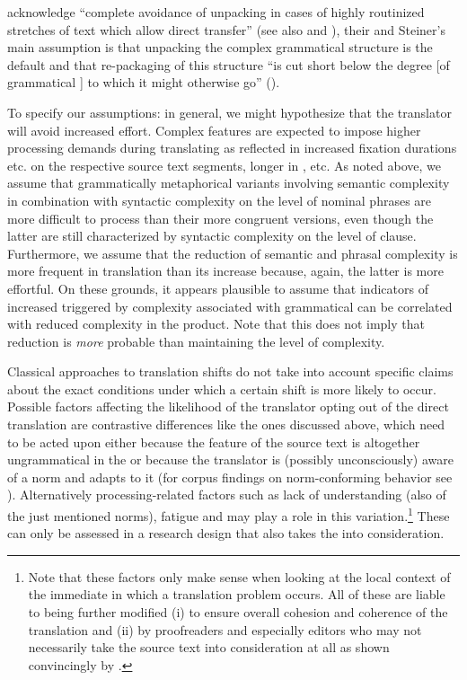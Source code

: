 \documentclass[output=paper]{LSP/langsci}
\begin{document}
acknowledge ``complete avoidance of unpacking in cases of highly routinized stretches of text which allow direct transfer'' (see also \citealt[145]{Hansen2003The} and \citealt[411]{TirkkonenCondit2005}), their and Steiner's  \citeyearpar{Steiner2001Translations} main assumption is that unpacking the complex grammatical structure is the default and that re-packaging of this structure ``is cut short below the degree [of grammatical ] to which it might otherwise go'' (\citealt[260]{HansenSchirra2012Towards}). 

To specify our assumptions: in general, we might hypothesize that the translator will avoid increased effort. Complex features are expected to impose higher processing demands during translating as reflected in increased fixation durations etc. on the respective source text segments, longer  in , etc. As noted above, we assume that grammatically metaphorical variants involving semantic complexity in combination with syntactic complexity on the level of nominal phrases are more difficult to process than their more congruent versions, even though the latter are still characterized by syntactic complexity on the level of clause. Furthermore, we assume that the reduction of semantic and phrasal complexity is more frequent in translation than its increase because, again, the latter is more effortful. On these grounds, it appears plausible to assume that indicators of increased  triggered by complexity associated with grammatical  can be correlated with reduced complexity in the product. Note that this does not imply that reduction is \textit{more} probable than maintaining the level of complexity. 

\largerpage
Classical approaches to translation shifts do not take into account specific claims about the exact conditions under which a certain shift is more likely to occur. Possible factors affecting the likelihood of the translator opting out of the direct translation are contrastive differences like the ones discussed above, which need to be acted upon either because the feature of the source text is altogether ungrammatical in the  or because the translator is (possibly unconsciously) aware of a  norm and adapts to it (for corpus findings on norm-conforming behavior see \citealt{Delaere2015}). Alternatively processing-related factors such as lack of understanding (also of the just mentioned norms), fatigue and  \citep{Steiner2001Translations} may play a role in this variation.\footnote{Note that these factors only make sense when looking at the local context of the immediate  in which a translation problem occurs. All of these are liable to being further modified (i) to ensure overall cohesion and coherence of the translation and (ii) by proofreaders and especially editors who may not necessarily take the source text into consideration at all as shown convincingly by \citet{Bisiada2013}.}  These can only be assessed in a research design that also takes the  into consideration.
\end{document}
